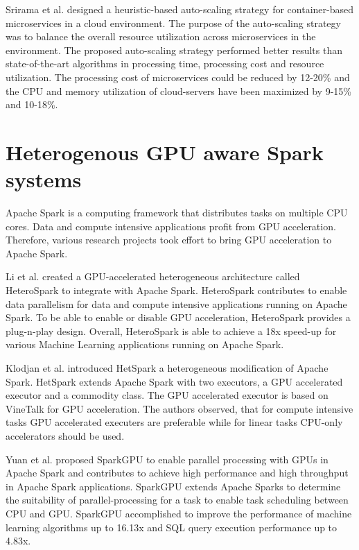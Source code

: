 Srirama et al. \citep{Srirama2020AppDeplyCont} designed a heuristic-based auto-scaling strategy for container-based microservices in a cloud environment.
The purpose of the auto-scaling strategy was to balance the overall resource utilization across microservices in the environment.
The proposed auto-scaling strategy performed better results than state-of-the-art algorithms in processing time, processing cost and resource utilization. The processing cost of microservices could be reduced by 12-20\% and the CPU and memory utilization of cloud-servers have been maximized by 9-15\% and 10-18\%.


\section{Heterogenous GPU aware Spark systems}
Apache Spark is a computing framework that distributes tasks on multiple CPU cores. Data and compute intensive applications profit from GPU acceleration. Therefore, various research projects took effort to bring GPU acceleration to Apache Spark.


Li et al. \cite{Li2015HeteroSpark} created a GPU-accelerated heterogeneous architecture called HeteroSpark to integrate with Apache Spark.
HeteroSpark contributes to enable data parallelism for data and compute intensive applications running on Apache Spark. To be able to enable or disable GPU acceleration, HeteroSpark provides a plug-n-play design.
Overall, HeteroSpark is able to achieve a 18x speed-up for various Machine Learning applications running on Apache Spark.


Klodjan et al. \cite{Klodjan2018HetSpark} introduced HetSpark a heterogeneous modification of Apache Spark.
HetSpark extends Apache Spark with two executors, a GPU accelerated executor and a commodity class. The GPU accelerated executor is based on VineTalk\cite{Mavridis2017VineTalk} for GPU acceleration.
The authors observed, that for compute intensive tasks GPU accelerated executers are preferable while for linear tasks CPU-only accelerators should be used.


Yuan et al. \cite{Yuan2016SparkGPU} proposed SparkGPU to enable parallel processing with GPUs in Apache Spark and contributes to achieve high performance and high throughput in Apache Spark applications.
SparkGPU extends Apache Sparks to determine the suitability of parallel-processing for a task to enable task scheduling between CPU and GPU. 
SparkGPU accomplished to improve the performance of machine learning algorithms up to 16.13x and SQL query execution performance up to 4.83x.



